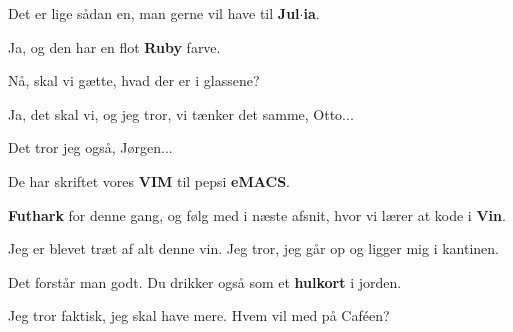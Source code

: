 \documentclass{article}
\begin{document}
\begin{sketch}
 Det er lige sådan en, man gerne vil have til \textbf{Jul$\cdot$ia}.

 Ja, og den har en flot \textbf{Ruby} farve.


 Nå, skal vi gætte, hvad der er i glassene?

 Ja, det skal vi, og jeg tror, vi tænker det samme, Otto...

 Det tror jeg også, Jørgen...

 De har skriftet vores \textbf{VIM} til pepsi \textbf{eMACS}. 


 \textbf{Futhark} for denne gang, og følg med i næste afsnit, hvor vi lærer at kode i \textbf{Vin}.

 Jeg er blevet træt af alt denne vin. Jeg tror, jeg går op og ligger mig i kantinen. 

 Det forstår man godt. Du drikker også som et \textbf{hulkort} i jorden.

 Jeg tror faktisk, jeg skal have mere. Hvem vil med på Caféen?


\end{sketch}
\end{document}
